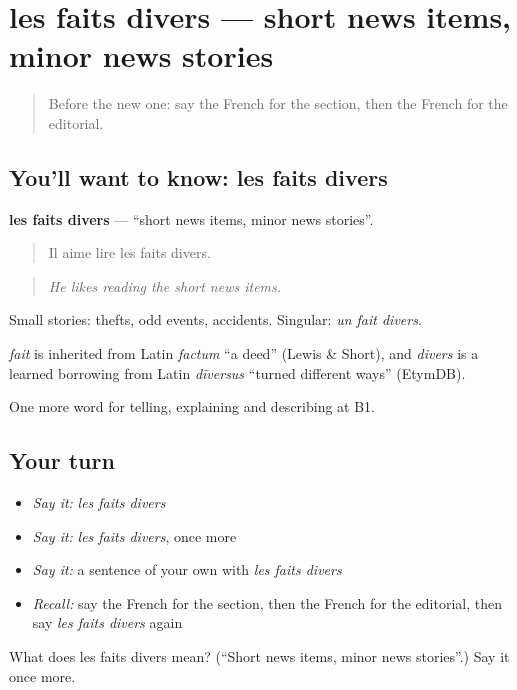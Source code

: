 \section[les faits divers]{les faits divers — short news items, minor news stories}

\label{lesson:FR-C282-faits-divers}



\begin{quote}
Before the new one: say the French for the section, then the French for the editorial.
\end{quote}

\subsection*{You'll want to know: les faits divers}
\textbf{les faits divers} — \textquotedblleft{}short news items, minor news stories\textquotedblright{}.

\begin{quote}
Il aime lire les faits divers.
\end{quote}

\begin{quote}
\emph{He likes reading the short news items.}
\end{quote}

Small stories: thefts, odd events, accidents. Singular: \emph{un fait divers}.

\begin{cousinweb}
\emph{fait} is inherited from Latin \emph{factum} \textquotedblleft{}a deed\textquotedblright{} (Lewis \& Short), and \emph{divers} is a learned borrowing from Latin \emph{dīversus} \textquotedblleft{}turned different ways\textquotedblright{} (EtymDB).
\end{cousinweb}

\begin{grammarlens}[title={What you've built}]
One more word for telling, explaining and describing at B1.
\end{grammarlens}

\subsection*{Your turn}
\begin{itemize}
\raggedright
  \item \emph{Say it:} \emph{les faits divers}
  \item \emph{Say it:} \emph{les faits divers}, once more
  \item \emph{Say it:} a sentence of your own with \emph{les faits divers}
  \item \emph{Recall:} say the French for the section, then the French for the editorial, then say \emph{les faits divers} again
\end{itemize}

\begin{tcolorbox}[breakable,colback=teal!4,colframe=teal!35!black,title={Before you move on}]
What does les faits divers mean? (\textquotedblleft{}Short news items, minor news stories\textquotedblright{}.) Say it once more.
\end{tcolorbox}
